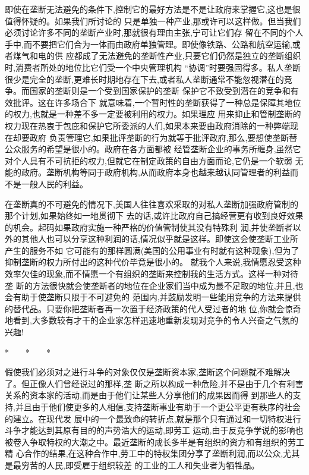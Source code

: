 ﻿\documentclass[12pt]{article}
\begin{document}
即使在垄断无法避免的条件下,控制它的最好方法是不是让政府来掌握它,这也是很值得怀疑的。如果我们所讨论的
只是单独一种产业,那或许可以这样做。但当我们必须讨论许多不同的垄断产业时,那就很有理由主张,宁可让它们存
留在不同的个人手中,而不要把它们合为一体而由政府单独管理。即使像铁路、公路和航空运输,或者煤气和电的供
应都成了无法避免的垄断性产业,只要它们仍然是独立的垄断组织时,消费者所处的地位比它们受一个中央管理机构
``协调''时要强固得多。私人垄断很少是完全的垄断,更难长时期地存在下去,或者私人垄断通常不能忽视潜在的竞
争。而国家的垄断则是一个受到国家保护的垄断 \myrule 保护它不致受到潜在的竞争和有效批评。这在许多场合下
就意味着,一个暂时性的垄断获得了一种总是保障其地位的权力,也就是一种差不多一定要被利用的权力。如果理应
用来抑止和管制垄断的权力现在热衷于包庇和保护它所委派的人们,如果本来要由政府消除的一种弊端现在却要政府
负责管理它,如果批评垄断的行为就等于批评政府,那么,要想使垄断替公众服务的希望是很小的。政府在各方面都被
经管垄断企业的事务所缠身,虽然它对个人具有不可抗拒的权力,但就它在制定政策的自由方面而论,它仍是一个软弱
无能的政府。垄断机构等同于政府机构,从而政府本身也越来越认同管理者的利益而不是一般人民的利益。

在垄断真的不可避免的情况下,美国人往往喜欢采取的对私人垄断加强政府管制的那个计划,如果始终如一地贯彻下
去的话,或许比政府自己搞经营更有收到良好效果的机会。起码如果政府实施一种严格的价值管制使其没有特殊利
润,并使垄断者以外的其他人也可以分享这种利润的话,情况似乎就是这样。即使这会使垄断工业所产生的服务不如
它可能有的那样圆满(美国的公用事业有时就有这种现象),但为了抑制垄断的权力所付出的这种代价毕竟是很小的。
就我个人来说,我情愿忍受这种效率欠佳的现象,而不情愿一个有组织的垄断来控制我的生活方式。这样一种对待垄
断的方法很快就会使垄断者的地位在企业家们当中成为最不足取的地位,并且,也会有助于使垄断只限于不可避免的
范围内,并鼓励发明一些能用竞争的方法来提供的替代品。只要你把垄断者再一次置于经济政策的代人受过者的地
位,你就会惊奇地看到,大多数较有才干的企业家怎样迅速地重新发现对竞争的令人兴奋之气氛的兴趣!

*　　*　　*

假使我们必须对之进行斗争的对象仅仅是垄断资本家,垄断这个问题就不难解决了。但正像人们曾经说过的那样,垄
断之所以构成一种危险,并不是由于几个有利害关系的资本家的活动,而是由于他们让某些人分享他们的成果因而得
到那些人的支持,并且由于他们使更多的人相信,支持垄断事业有助于一个更公平更有秩序的社会的建立。在现代发
展中的一个最致命的转折点,就是那个只有通过和一切特权进行斗争才能达到其原有目的的声势浩大的运动,即劳工
运动,由于反竞争学说的影响也被卷入争取特权的大潮之中。最近垄断的成长多半是有组织的资方和有组织的劳工精
心合作的结果,在这种合作中,劳工中的特权集团分享了垄断利润,而以公众,尤其是最穷苦的人民,即受雇于组织较差
的工业的工人和失业者为牺牲品。
\end{document}
